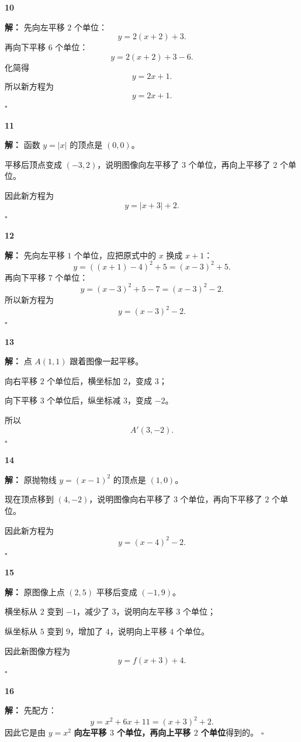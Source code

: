 \documentclass[11pt,a4paper,fontset=fandol]{ctexart}
\theoremstyle{formalexample}
\newenvironment{solution}{\par\noindent\textbf{解：}}{\hfill$\square$\par}
\begin{document}
\textbf{10}\begin{solution}
先向左平移 $2$ 个单位：
\[
y=2(x+2)+3.
\]
再向下平移 $6$ 个单位：
\[
y=2(x+2)+3-6.
\]
化简得
\[
y=2x+1.
\]
所以新方程为
\[
\boxed{y=2x+1}.
\]
\end{solution}

\textbf{11}\begin{solution}
函数 $y=|x|$ 的顶点是 $(0,0)$。

平移后顶点变成 $(-3,2)$，说明图像向左平移了 $3$ 个单位，再向上平移了 $2$ 个单位。

因此新方程为
\[
\boxed{y=|x+3|+2}.
\]
\end{solution}

\textbf{12}\begin{solution}
先向左平移 $1$ 个单位，应把原式中的 $x$ 换成 $x+1$：
\[
y=((x+1)-4)^2+5=(x-3)^2+5.
\]
再向下平移 $7$ 个单位：
\[
y=(x-3)^2+5-7=(x-3)^2-2.
\]
所以新方程为
\[
\boxed{y=(x-3)^2-2}.
\]
\end{solution}

\textbf{13}\begin{solution}
点 $A(1,1)$ 跟着图像一起平移。

向右平移 $2$ 个单位后，横坐标加 $2$，变成 $3$；

向下平移 $3$ 个单位后，纵坐标减 $3$，变成 $-2$。

所以
\[
\boxed{A'(3,-2)}.
\]
\end{solution}

\textbf{14}\begin{solution}
原抛物线 $y=(x-1)^2$ 的顶点是 $(1,0)$。

现在顶点移到 $(4,-2)$，说明图像向右平移了 $3$ 个单位，再向下平移了 $2$ 个单位。

因此新方程为
\[
\boxed{y=(x-4)^2-2}.
\]
\end{solution}

\textbf{15}\begin{solution}
原图像上点 $(2,5)$ 平移后变成 $(-1,9)$。

横坐标从 $2$ 变到 $-1$，减少了 $3$，说明向左平移 $3$ 个单位；

纵坐标从 $5$ 变到 $9$，增加了 $4$，说明向上平移 $4$ 个单位。

因此新图像方程为
\[
\boxed{y=f(x+3)+4}.
\]
\end{solution}

\textbf{16}\begin{solution}
先配方：
\[
y=x^2+6x+11=(x+3)^2+2.
\]
因此它是由 $y=x^2$ \textbf{向左平移 $3$ 个单位，再向上平移 $2$ 个单位}得到的。
\end{solution}
\end{document}

